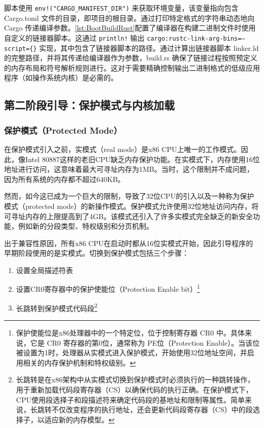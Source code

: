 脚本使用 \texttt{env!("CARGO\_MANIFEST\_DIR")} 来获取环境变量，该变量指向包含 Cargo.toml 文件的目录，即项目的根目录。通过打印特定格式的字符串动态地向 Cargo 传递编译参数。\cref{lst:BootBuildRust}配置了编译器在构建二进制文件时使用自定义的链接器脚本。这通过 \texttt{println!} 输出 \texttt{cargo:rustc-link-arg-bins=--script=\{\}} 实现，其中包含了链接器脚本的路径。通过计算出链接器脚本 linker.ld 的完整路径，并将其传递给编译器作为参数，build.rs 确保了链接过程按照预定义的内存布局和符号解析规则进行。这对于需要精确控制输出二进制格式的低级应用程序（如操作系统内核）是必需的。

\subsection{第二阶段引导：保护模式与内核加载}

\subsubsection{保护模式（Protected Mode）}

在保护模式引入之前，实模式（real mode）是x86 CPU上唯一的工作模式。因此，像Intel 80887这样的老旧CPU缺乏内存保护功能。在实模式下，内存使用16位地址进行访问，这意味着最大可寻址内存为1MB。当时，这个限制并不成问题，因为所有系统的内存都不超过640KB。

然而，如今这已成为一个巨大的限制，导致了32位CPU的引入以及一种称为保护模式（protected mode）的新操作模式。保护模式允许使用32位地址访问内存，将可寻址内存的上限提高到了4GB。该模式还引入了许多实模式完全缺乏的新安全功能，例如新的分段类型、特权级别和分页机制。

出于兼容性原因，所有x86 CPU在启动时都从16位实模式开始，因此引导程序的早期阶段使用的是实模式。切换到保护模式包括三个步骤：

\begin{enumerate}
    \item 设置全局描述符表
    \item 设置CR0寄存器中的保护使能位（Protection Enable bit）\footnote{保护使能位是x86处理器中的一个特定位，位于控制寄存器 CR0 中。具体来说，它是 CR0 寄存器的第0位，通常称为 PE位（Protection Enable）。当该位被设置为1时，处理器从实模式进入保护模式，开始使用32位地址空间，并启用相关的内存保护机制和特权级别。}
    \item 长跳转到保护模式代码段\footnote{长跳转是在x86架构中从实模式切换到保护模式时必须执行的一种跳转操作，用于重新加载代码段寄存器（CS）以确保代码的执行正确。在保护模式下，CPU使用段选择子和段描述符来确定代码段的基地址和限制等属性。简单来说，长跳转不仅改变程序的执行地址，还会更新代码段寄存器（CS）中的段选择子，以适应新的内存模型。}
\end{enumerate}

